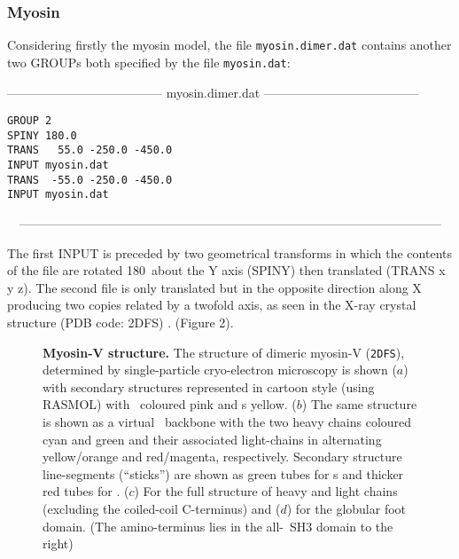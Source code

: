 \subsubsection{Myosin}

Considering firstly the myosin model, the file {\tt myosin.dimer.dat} contains
another two GROUPs both specified by the file {\tt myosin.dat}:

\begin{singlespace}
--------------------------------------
myosin.dimer.dat
--------------------------------------
\begin{verbatim}
GROUP 2
SPINY 180.0
TRANS   55.0 -250.0 -450.0
INPUT myosin.dat
TRANS  -55.0 -250.0 -450.0
INPUT myosin.dat
\end{verbatim}
\ \ ------------------------------------------------------------------------------------------------------
\end{singlespace}

The first INPUT is preceded by two geometrical transforms in which the contents
of the file are rotated 180\degre\ about the Y axis (SPINY) then translated 
(TRANS x y z).  The second file is only translated but in the opposite direction
along X producing two copies related by a twofold axis, as seen in the X-ray
crystal structure (PDB code: 2DFS) \cite{LiuJet06a}. (Figure 2).

\begin{figure}
\centering
{}
\caption{
\label{Fig:myo2DFS}
{\bf Myosin-V structure.}
The structure of dimeric myosin-V ({\tt 2DFS}), determined by single-particle cryo-electron microscopy
is shown ($a$) with secondary structures represented in cartoon style (using {\small RASMOL}) with
\AH\ coloured pink and \Bs s yellow.  ($b$) The same structure is shown as a virtual \CA\ 
backbone with the two heavy chains coloured cyan and green and their associated light-chains
in alternating yellow/orange and red/magenta, respectively.
Secondary structure line-segments (``sticks'') are shown as green tubes
for \Bs s and thicker red tubes for \AHs .
($c$) For the full structure of heavy and light chains (excluding the coiled-coil C-terminus) and
($d$) for the globular foot domain.  (The amino-terminus lies in the all-\B\ SH3 domain to the right)
}
\end{figure}

